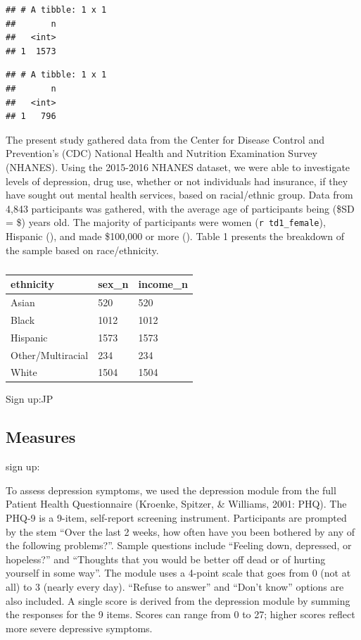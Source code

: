 \documentclass[man]{apa6}
\begin{document}
\begin{verbatim}
## # A tibble: 1 x 1
##       n
##   <int>
## 1  1573
\end{verbatim}

\begin{verbatim}
## # A tibble: 1 x 1
##       n
##   <int>
## 1   796
\end{verbatim}

The present study gathered data from the Center for Disease Control and
Prevention's (CDC) National Health and Nutrition Examination Survey
(NHANES). Using the 2015-2016 NHANES dataset, we were able to
investigate levels of depression, drug use, whether or not individuals
had insurance, if they have sought out mental health services, based on
racial/ethnic group. Data from 4,843 participants was gathered, with the
average age of participants being (\$SD = \$) years old. The majority of
participants were women (\texttt{r\ td1\_female}), Hispanic (), and made
\$100,000 or more (). Table 1 presents the breakdown of the sample based
on race/ethnicity.

\begin{table}[tbp]
\begin{center}
\begin{threeparttable}
\caption{\label{tab:apa table}}
\begin{tabular}{lll}
\toprule
ethnicity & \multicolumn{1}{c}{sex\_n} & \multicolumn{1}{c}{income\_n}\\
\midrule
Asian & 520 & 520\\
Black & 1012 & 1012\\
Hispanic & 1573 & 1573\\
Other/Multiracial & 234 & 234\\
White & 1504 & 1504\\
\bottomrule
\end{tabular}
\end{threeparttable}
\end{center}
\end{table}

Sign up:JP

\subsection{Measures}\label{measures}

sign up:

To assess depression symptoms, we used the depression module from the
full Patient Health Questionnaire (Kroenke, Spitzer, \& Williams, 2001:
PHQ). The PHQ-9 is a 9-item, self-report screening instrument.
Participants are prompted by the stem \enquote{Over the last 2 weeks,
how often have you been bothered by any of the following problems?}.
Sample questions include \enquote{Feeling down, depressed, or hopeless?}
and \enquote{Thoughts that you would be better off dead or of hurting
yourself in some way}. The module uses a 4-point scale that goes from 0
(not at all) to 3 (nearly every day). \enquote{Refuse to answer} and
\enquote{Don't know} options are also included. A single score is
derived from the depression module by summing the responses for the 9
items. Scores can range from 0 to 27; higher scores reflect more severe
depressive symptoms.
\end{document}
